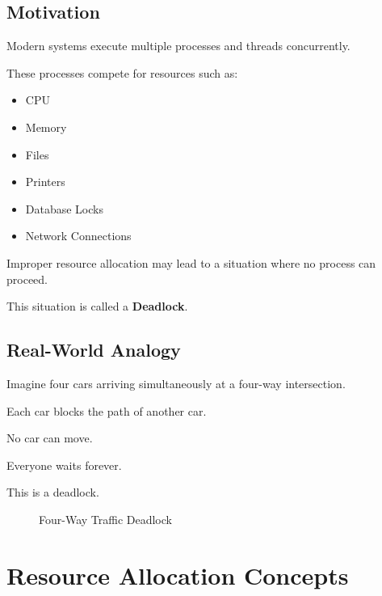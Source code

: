 \subsection{Motivation}

Modern systems execute multiple processes and threads concurrently.

These processes compete for resources such as:

\begin{itemize}
\item CPU
\item Memory
\item Files
\item Printers
\item Database Locks
\item Network Connections
\end{itemize}

Improper resource allocation may lead to a situation where no process can proceed.

This situation is called a \textbf{Deadlock}.

\subsection{Real-World Analogy}

Imagine four cars arriving simultaneously at a four-way intersection.

Each car blocks the path of another car.

No car can move.

Everyone waits forever.

This is a deadlock.

\begin{figure}[H]
\centering
{}
\caption{Four-Way Traffic Deadlock}
\end{figure}

\section{Resource Allocation Concepts}

